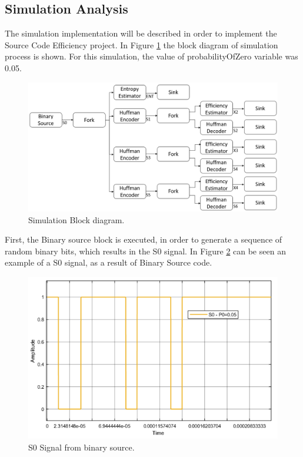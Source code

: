 \begin{refsection}
\subsection{Simulation Analysis}

The simulation implementation will be described in order to implement the Source Code Efficiency project. In Figure \ref{f:simulationdiagram} the block diagram of simulation process is shown.
For this simulation, the value of probabilityOfZero variable was 0.05. 

\begin{figure}[!h]
\centering
\includegraphics[width=6in]{./sdf/eit_45550_estimator_source_code_efficiency/figures/simulationdiagram.png}
\caption[Simulation Block diagram.]{Simulation Block diagram.}
\label{f:simulationdiagram}
\end{figure}

First, the Binary source block is executed, in order to generate a sequence of random binary bits, which results in the S0 signal. In Figure \ref{f:S0} can be seen an example of a S0 signal, as a result of Binary Source code. 


\begin{figure}[!h]
\centering
\includegraphics[width=5in]{./sdf/eit_45550_estimator_source_code_efficiency/figures/S0.png}
\caption[S0 Signal from binary source.]{S0 Signal from binary source.}
\label{f:S0}
\end{figure}


\end{refsection}
